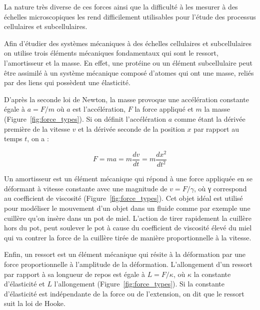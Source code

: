 \documentclass[12pt,a4paper,twoside,openright]{book}
\begin{document}
La nature très diverse de ces forces ainsi que la difficulté à les
mesurer à des échelles microscopiques les rend difficilement utilisables
pour l'étude des processus cellulaires et subcellulaires.

Afin d'étudier des systèmes mécaniques à des échelles cellulaires et
subcellulaires on utilise trois éléments mécaniques fondamentaux qui
sont le ressort, l'amortisseur et la masse. En effet, une protéine ou un
élément subcellulaire peut être assimilé à un système mécanique composé
d'atomes qui ont une masse, reliés par des liens qui possèdent une
élasticité.

D'après la seconde loi de Newton, la masse provoque une accélération
constante égale à \(a = F/m\) où \(a\) est l'accélération, \(F\) la
force appliqué et \(m\) la masse (Figure~\ref{fig:force_types}). Si on
définit l'accélération \(a\) comme étant la dérivée première de la
vitesse \(v\) et la dérivée seconde de la position \(x\) par rapport au
temps \(t\), on a :

\[
F = ma = m\frac{dv}{dt} = m\frac{dx^2}{dt^2}
\]

Un amortisseur est un élément mécanique qui répond à une force appliquée
en se déformant à vitesse constante avec une magnitude de
\(v = F/\gamma\), où γ correspond au coefficient de viscosité
(Figure~\ref{fig:force_types}). Cet objet idéal est utilisé pour
modéliser le mouvement d'un objet dans un fluide comme par exemple une
cuillère qu'on insère dans un pot de miel. L'action de tirer rapidement
la cuillère hors du pot, peut soulever le pot à cause du coefficient de
viscosité élevé du miel qui va contrer la force de la cuillère tirée de
manière proportionnelle à la vitesse.

Enfin, un ressort est un élément mécanique qui résite à la déformation
par une force proportionnelle à l'amplitude de la déformation.
L'allongement d'un ressort par rapport à sa longueur de repos est égale
à \(L = F/\kappa\), où \(\kappa\) la constante d'élasticité et \(L\)
l'allongement (Figure~\ref{fig:force_types}). Si la constante
d'élasticité est indépendante de la force ou de l'extension, on dit que
le ressort suit la loi de Hooke.
\end{document}
